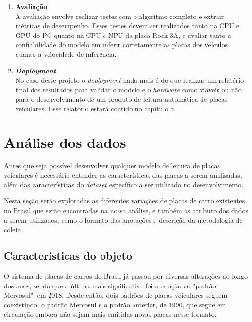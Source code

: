 \begin{enumerate}
    Por fim, a última etapa de modelagem é a criação e treinamentos de modelos de redes neurais de classificação de caracteres, que devem ser capazes de identificar caracteres a partir das imagens extraídas pelo algoritmo de extração de caracteres desenvolvido.
    \item \textbf{Avaliação} \\
    A avaliação envolve realizar testes com o algoritmo completo e extrair métricas de desempenho. Esses testes devem ser realizados tanto na CPU e GPU do PC quanto na CPU e NPU da placa Rock 3A, e avaliar tanto a confiabilidade do modelo em inferir corretamente as placas dos veículos quanto a velocidade de inferência.
    \item \textbf{\textit{Deployment}} \\
    No caso deste projeto o \textit{deployment} nada mais é do que realizar um relatório final dos resultados para validar o modelo e o \textit{hardware} como viáveis ou não para o desenvolvimento de um produto de leitura automática de placas veiculares. Esse relatório estará contido no capítulo 5.
\end{enumerate}

\section{Análise dos dados}

Antes que seja possível desenvolver qualquer modelo de leitura de placas veiculares é necessário entender as características das placas a serem analisadas, além das características do \textit{dataset} específico a ser utilizado no desenvolvimento.

Nesta seção serão exploradas as diferentes variações de placas de carro existentes no Brasil que serão encontradas na nossa análise, e também os atributo dos dados a serem utilizados, como o formato das anotações e descrição da metodologia de coleta.

\subsection{Características do objeto}

O sistema de placas de carros do Brasil já passou por diversas alterações ao longo dos anos, sendo que a última mais significativa foi a adoção do "padrão Mercosul", em 2018. Desde então, dois padrões de placas veiculares seguem coexistindo, o padrão Mercosul e o padrão anterior, de 1990, que segue em circulação embora não sejam mais emitidas novas placas nesse formato.

